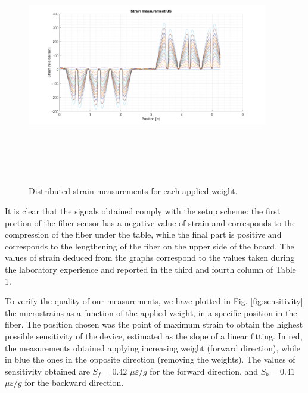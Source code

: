\begin{figure}[H]
	\centering
	\includegraphics[height=10.5cm, width=10.5cm, keepaspectratio]{img/nostro.png}
	\caption{Distributed strain measurements for each applied weight.}\label{fig:strain}
\end{figure}

It is clear that the signals obtained comply with the setup scheme: the first portion of the fiber sensor has a negative value of strain and corresponds to the compression of the fiber under the table, while the final part is positive and corresponds to the lengthening of the fiber on the upper side of the board. The values of strain deduced from the graphs correspond to the values taken during the laboratory experience and reported in the third and fourth column of Table 1.




To verify the quality of our measurements, we have plotted in Fig. \ref{fig:sensitivity} the microstrains as a function of the applied weight, in a specific position in the fiber. The position chosen was the point of maximum strain to obtain the highest possible sensitivity of the device, estimated as the slope of a linear fitting. In red, the measurements obtained applying increasing weight (forward direction), while in blue the ones in the opposite direction (removing the weights). The values of sensitivity obtained are $S_f = 0.42$ $\mu \varepsilon / g$ for the forward direction, and $S_b = 0.41$ $\mu \varepsilon / g$ for the backward direction.

